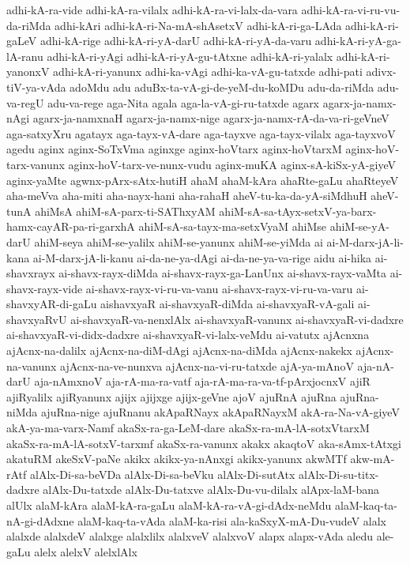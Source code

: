 {adhi-kA-ra-vide
adhi-kA-ra-vilalx
adhi-kA-ra-vi-lalx-da-vara
adhi-kA-ra-vi-ru-vu-da-riMda
adhi-kAri
adhi-kA-ri-Na-mA-shAsetxV
adhi-kA-ri-ga-LAda
adhi-kA-ri-gaLeV
adhi-kA-rige
adhi-kA-ri-yA-darU
adhi-kA-ri-yA-da-varu
adhi-kA-ri-yA-ga-lA-ranu
adhi-kA-ri-yAgi
adhi-kA-ri-yA-gu-tAtxne
adhi-kA-ri-yalalx
adhi-kA-ri-yanonxV
adhi-kA-ri-yanunx
adhi-ka-vAgi
adhi-ka-vA-gu-tatxde
adhi-pati
adivx-tiV-ya-vAda
adoMdu
adu
aduBx-ta-vA-gi-de-yeM-du-koMDu
adu-da-riMda
adu-va-regU
adu-va-rege
aga-Nita
agala
aga-la-vA-gi-ru-tatxde
agarx
agarx-ja-namx-nAgi
agarx-ja-namxnaH
agarx-ja-namx-nige
agarx-ja-namx-rA-da-va-ri-geVneV
aga-satxyXru
agatayx
aga-tayx-vA-dare
aga-tayxve
aga-tayx-vilalx
aga-tayxvoV
agedu
aginx
aginx-SoTxVma
aginxge
aginx-hoVtarx
aginx-hoVtarxM
aginx-hoV-tarx-vanunx
aginx-hoV-tarx-ve-nunx-vudu
aginx-muKA
aginx-sA-kiSx-yA-giyeV
aginx-yaMte
agwnx-pArx-sAtx-hutiH
ahaM
ahaM-kAra
ahaRte-gaLu
ahaRteyeV
aha-meVva
aha-miti
aha-nayx-hani
aha-rahaH
aheV-tu-ka-da-yA-siMdhuH
aheV-tunA
ahiMsA
ahiM-sA-parx-ti-SAThxyAM
ahiM-sA-sa-tAyx-setxV-ya-barx-hamx-cayAR-pa-ri-garxhA
ahiM-sA-sa-tayx-ma-setxVyaM
ahiMse
ahiM-se-yA-darU
ahiM-seya
ahiM-se-yalilx
ahiM-se-yanunx
ahiM-se-yiMda
ai
ai-M-darx-jA-li-kana
ai-M-darx-jA-li-kanu
ai-da-ne-ya-dAgi
ai-da-ne-ya-va-rige
aidu
ai-hika
ai-shavxrayx
ai-shavx-rayx-diMda
ai-shavx-rayx-ga-LanUnx
ai-shavx-rayx-vaMta
ai-shavx-rayx-vide
ai-shavx-rayx-vi-ru-va-vanu
ai-shavx-rayx-vi-ru-va-varu
ai-shavxyAR-di-gaLu
aishavxyaR
ai-shavxyaR-diMda
ai-shavxyaR-vA-gali
ai-shavxyaRvU
ai-shavxyaR-va-nenxlAlx
ai-shavxyaR-vanunx
ai-shavxyaR-vi-dadxre
ai-shavxyaR-vi-didx-dadxre
ai-shavxyaR-vi-lalx-veMdu
ai-vatutx
ajAcnxna
ajAcnx-na-dalilx
ajAcnx-na-diM-dAgi
ajAcnx-na-diMda
ajAcnx-nakekx
ajAcnx-na-vanunx
ajAcnx-na-ve-nunxva
ajAcnx-na-vi-ru-tatxde
ajA-ya-mAnoV
aja-nA-darU
aja-nAmxnoV
aja-rA-ma-ra-vatf
aja-rA-ma-ra-va-tf-pArxjocnxV
ajiR
ajiRyalilx
ajiRyanunx
ajijx
ajijxge
ajijx-geVne
ajoV
ajuRnA
ajuRna
ajuRna-niMda
ajuRna-nige
ajuRnanu
akApaRNayx
akApaRNayxM
akA-ra-Na-vA-giyeV
akA-ya-ma-varx-Namf
akaSx-ra-ga-LeM-dare
akaSx-ra-mA-lA-sotxVtarxM
akaSx-ra-mA-lA-sotxV-tarxmf
akaSx-ra-vanunx
akakx
akaqtoV
aka-sAmx-tAtxgi
akatuRM
akeSxV-paNe
akikx
akikx-ya-nAnxgi
akikx-yanunx
akwMTf
akw-mA-rAtf
alAlx-Di-sa-beVDa
alAlx-Di-sa-beVku
alAlx-Di-sutAtx
alAlx-Di-su-titx-dadxre
alAlx-Du-tatxde
alAlx-Du-tatxve
alAlx-Du-vu-dilalx
alApx-laM-bana
alUlx
alaM-kAra
alaM-kA-ra-gaLu
alaM-kA-ra-vA-gi-dAdx-neMdu
alaM-kaq-ta-nA-gi-dAdxne
alaM-kaq-ta-vAda
alaM-ka-risi
ala-kaSxyX-mA-Du-vudeV
alalx
alalxde
alalxdeV
alalxge
alalxlilx
alalxveV
alalxvoV
alapx
alapx-vAda
aledu
ale-gaLu
alelx
alelxV
alelxlAlx
}
